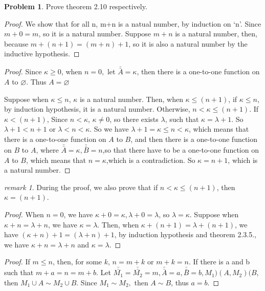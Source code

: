 \documentclass[a4paper,11pt]{article}%
\theoremstyle{remark}
\newtheorem*{remark}{remark}
\theoremstyle{definition}
\newtheorem{problem}{Problem}[subsection]
\begin{document}
\begin{problem}
    Prove theorem 2.10 respectively.
\begin{proof}
    We show that for all n, m+n is a natual number, by induction on 
    `n'. Since $m+0=m$, so it is a natural number. Suppose $m+n$ is a 
    natural number, then, because $m+(n+1)=(m+n)+1$, so it is also a natural number by the
    inductive hypothesis.
\end{proof}
\begin{proof}
    Since $\kappa\geq 0$, when $n=0,$ let $\bar{\bar{A}}=\kappa$, then there is a 
    one-to-one function on $A$ to $\varnothing$. Thus $A=\varnothing$

    Suppose when $\kappa\leq n$, $\kappa$ is a natural number.
    Then, when $\kappa\leq (n+1)$, if $\kappa\leq n$, by induction hypothesis, 
    it is a natural number. Otherwise, $n<\kappa\leq(n+1)$. If $\kappa<(n+1)$,
    Since $n<\kappa$, $\kappa\neq 0$, so there exists $\lambda$, such that $\kappa=\lambda+1$.
    So $\lambda+1<n+1$ or $\lambda<n<\kappa$. So we have $\lambda+1=\kappa\leq n<\kappa$, which means that
   there is a one-to-one function on $A$ to $B$, and then there is a one-to-one function on $B$ to $A$, 
   where $\bar{\bar{A}}=\kappa,\bar{\bar{B}}=n$,so that there have to be a one-to-one function on $A$ to $B$,
   which means that $n=\kappa$,which is a contradiction. So $\kappa=n+1$, which is a natural number.
\end{proof}
   \begin{remark}
    During the proof, we also prove that if $n<\kappa\leq(n+1)$, then $\kappa=(n+1)$.
   \end{remark}
\begin{proof}
    When $n=0$, we have $\kappa+0=\kappa,\lambda+0=\lambda$, so $\lambda=\kappa$.
    Suppose when $\kappa+n=\lambda+n$, we have $\kappa=\lambda$.
    Then, when $\kappa+(n+1)=\lambda+(n+1)$, we have $(\kappa+n)+1=(\lambda+n)+1$,
    by induction hypothesis and theorem 2.3.5., we have $\kappa+n=\lambda+n$ and $\kappa=\lambda$.
\end{proof}
\begin{proof}
 If $m\leq n$, then, for some $k$, $n=m+k$ or $m+k=n.$
 If there is a and b such that $m+a=n=m+b$.
 Let $\bar{\bar{M_1}}=\bar{\bar{M_2}}=m,\bar{\bar{A}}=a,\bar{\bar{B}}=b,M_1)(A,M_2)(B$,
 then $M_1\cup A\sim M_2\cup B$. Since $M_1\sim M_2,$ then $A\sim B$, thus $a=b.$


\end{proof}
\end{problem}
\end{document}
